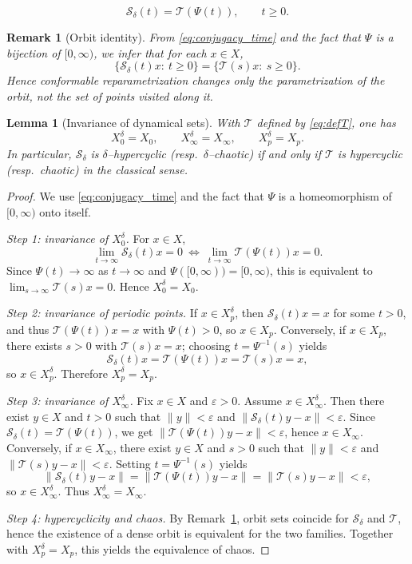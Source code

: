 \documentclass[10pt,a4paper]{amsart}
\newtheorem{remark}{Remark}
\newtheorem{lemma}{Lemma}
\begin{document}
\begin{equation}\label{eq:conjugacy_time}
\mathcal S_\delta(t)=\mathcal T(\Psi(t)),\qquad t\ge0.
\end{equation}

\begin{remark}[Orbit identity]\label{rem:orbit_identity}
From \eqref{eq:conjugacy_time} and the fact that $\Psi$ is a bijection of $[0,\infty)$,
we infer that for each $x\in X$,
\[
\{\mathcal S_\delta(t)x:\ t\ge0\}
=
\{\mathcal T(s)x:\ s\ge0\}.
\]
Hence conformable reparametrization changes only the parametrization of the orbit,
not the set of points visited along it.
\end{remark}

\begin{lemma}[Invariance of dynamical sets]\label{lem:invariance_sets}
With $\mathcal T$ defined by \eqref{eq:defT}, one has
\[
X_0^\delta=X_0,\qquad X_\infty^\delta=X_\infty,\qquad X_p^\delta=X_p.
\]
In particular, $\mathcal S_\delta$ is $\delta$--hypercyclic (resp.\ $\delta$--chaotic)
if and only if $\mathcal T$ is hypercyclic (resp.\ chaotic) in the classical sense.
\end{lemma}

\begin{proof}
We use \eqref{eq:conjugacy_time} and the fact that $\Psi$ is a homeomorphism of
$[0,\infty)$ onto itself.

\smallskip
\noindent\emph{Step 1: invariance of $X_0^\delta$.}
For $x\in X$,
\[
\lim_{t\to\infty}\mathcal S_\delta(t)x=0
\ \Longleftrightarrow\
\lim_{t\to\infty}\mathcal T(\Psi(t))x=0.
\]
Since $\Psi(t)\to\infty$ as $t\to\infty$ and $\Psi([0,\infty))=[0,\infty)$,
this is equivalent to $\lim_{s\to\infty}\mathcal T(s)x=0$.
Hence $X_0^\delta=X_0$.

\smallskip
\noindent\emph{Step 2: invariance of periodic points.}
If $x\in X_p^\delta$, then $\mathcal S_\delta(t)x=x$ for some $t>0$, and thus
$\mathcal T(\Psi(t))x=x$ with $\Psi(t)>0$, so $x\in X_p$.
Conversely, if $x\in X_p$, there exists $s>0$ with $\mathcal T(s)x=x$; choosing
$t=\Psi^{-1}(s)$ yields
\[
\mathcal S_\delta(t)x=\mathcal T(\Psi(t))x=\mathcal T(s)x=x,
\]
so $x\in X_p^\delta$.
Therefore $X_p^\delta=X_p$.

\smallskip
\noindent\emph{Step 3: invariance of $X_\infty^\delta$.}
Fix $x\in X$ and $\varepsilon>0$.
Assume $x\in X_\infty^\delta$. Then there exist $y\in X$ and $t>0$ such that
$\|y\|<\varepsilon$ and $\|\mathcal S_\delta(t)y-x\|<\varepsilon$.
Since $\mathcal S_\delta(t)=\mathcal T(\Psi(t))$, we get
$\|\mathcal T(\Psi(t))y-x\|<\varepsilon$, hence $x\in X_\infty$.
Conversely, if $x\in X_\infty$, there exist $y\in X$ and $s>0$ such that
$\|y\|<\varepsilon$ and $\|\mathcal T(s)y-x\|<\varepsilon$.
Setting $t=\Psi^{-1}(s)$ yields
\[
\|\mathcal S_\delta(t)y-x\|
=
\|\mathcal T(\Psi(t))y-x\|
=
\|\mathcal T(s)y-x\|
<\varepsilon,
\]
so $x\in X_\infty^\delta$.
Thus $X_\infty^\delta=X_\infty$.

\smallskip
\noindent\emph{Step 4: hypercyclicity and chaos.}
By Remark~\ref{rem:orbit_identity}, orbit sets coincide for $\mathcal S_\delta$ and
$\mathcal T$, hence the existence of a dense orbit is equivalent for the two families.
Together with $X_p^\delta=X_p$, this yields the equivalence of chaos.
\end{proof}
\end{document}
